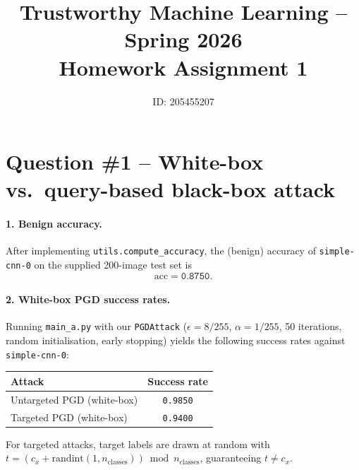 \documentclass[11pt]{article}
\title{Trustworthy Machine Learning -- Spring 2026\\
       Homework Assignment 1}
\author{ID: 205455207}
\date{}
\begin{document}
\maketitle

\section*{Question \#1 -- White-box vs.\ query-based black-box attack}

\paragraph{1. Benign accuracy.}
After implementing \texttt{utils.compute\_accuracy}, the (benign) accuracy of
\texttt{simple-cnn-0} on the supplied 200-image test set is
\[
\boxed{\mathrm{acc} = \texttt{0.8750}}.
\]

\paragraph{2. White-box PGD success rates.}
Running \texttt{main\_a.py} with our \texttt{PGDAttack} (\(\epsilon=8/255\),
\(\alpha=1/255\), 50 iterations, random initialisation, early stopping)
yields the following success rates against \texttt{simple-cnn-0}:
\begin{center}
\begin{tabular}{lc}
\toprule
Attack & Success rate \\
\midrule
Untargeted PGD (white-box) & \texttt{0.9850} \\
Targeted PGD (white-box)   & \texttt{0.9400} \\
\bottomrule
\end{tabular}
\end{center}
For targeted attacks, target labels are drawn at random with
\(t = (c_x + \mathrm{randint}(1,n_{\mathrm{classes}}))\bmod n_{\mathrm{classes}}\),
guaranteeing \(t\neq c_x\).
\end{document}
